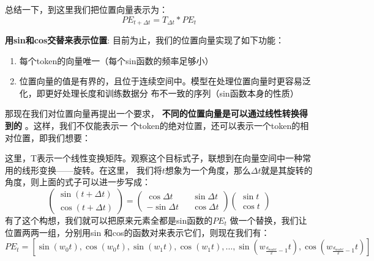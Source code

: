\documentclass[11pt]{article}
\begin{document}
总结一下，到这里我们把位置向量表示为：
\begin{equation*}
PE_{t+\Delta t}=T_{\Delta t}* PE_t
\end{equation*}

\textbf{用sin和cos交替来表示位置}: 目前为止，我们的位置向量实现了如下功能：
\begin{enumerate}
\item 每个token的向量唯一（每个sin函数的频率足够小）
\item 位置向量的值是有界的，且位于连续空间中。模型在处理位置向量时更容易泛化，即更好处理长度和训练数据分
布不一致的序列（sin函数本身的性质）
\end{enumerate}

那现在我们对位置向量再提出一个要求， \textbf{不同的位置向量是可以通过线性转换得到的} 。这样，我们不仅能表示一
个token的绝对位置，还可以表示一个token的相对位置，即我们想要：

这里，T表示一个线性变换矩阵。观察这个目标式子，联想到在向量空间中一种常用的线形变换——旋转。在这里，
我们将\(t\)想象为一个角度，那么\(\Delta t\)就是其旋转的角度，则上面的式子可以进一步写成：
\begin{equation*}
\begin{pmatrix}
\sin(t+\Delta t)\\\cos(t+\Delta t)
\end{pmatrix}=
\begin{pmatrix}
\cos\Delta t&&\sin\Delta t\\
-\sin\Delta t&&\cos\Delta t
\end{pmatrix}
\begin{pmatrix}
\sin t\\\cos t
\end{pmatrix}
\end{equation*}
有了这个构想，我们就可以把原来元素全都是sin函数的\(PE_t\) 做一个替换，我们让位置两两一组，分别用sin
和cos的函数对来表示它们，则现在我们有：
   \begin{equation*}
PE_t=[\sin(w_0t),\cos(w_0t),\sin(w_1t),\cos(w_1t),\dots,\sin(w_{\frac{d_{model}}{2}-1}t),
\cos(w_{\frac{d_{model}}{2}-1}t)]
   \end{equation*}
\end{document}
